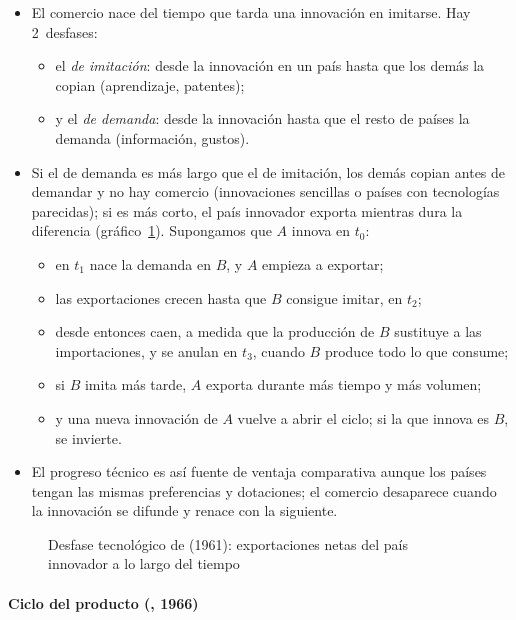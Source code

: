 \documentclass[11pt]{article}
\begin{document}
\begin{itemize}
\item El comercio nace del tiempo que tarda una innovación en imitarse\nocite{Posner1961International}. Hay 2~desfases:
  \begin{itemize}
  \item el \emph{de imitación}: desde la innovación en un país hasta que los demás la copian (aprendizaje, patentes);
  \item y el \emph{de demanda}: desde la innovación hasta que el resto de países la demanda (información, gustos).
  \end{itemize}
\item Si el de demanda es más largo que el de imitación, los demás copian antes de demandar y no hay comercio (innovaciones sencillas o países con tecnologías parecidas); si es más corto, el país innovador exporta mientras dura la diferencia (gráfico~\ref{fig:posner}). Supongamos que $A$ innova en $t_0$:
  \begin{itemize}
  \item en $t_1$ nace la demanda en $B$, y $A$ empieza a exportar;
  \item las exportaciones crecen hasta que $B$ consigue imitar, en $t_2$;
  \item desde entonces caen, a medida que la producción de $B$ sustituye a las importaciones, y se anulan en $t_3$, cuando $B$ produce todo lo que consume;
  \item si $B$ imita más tarde, $A$ exporta durante más tiempo y más volumen;
  \item y una nueva innovación de $A$ vuelve a abrir el ciclo; si la que innova es $B$, se invierte.
  \end{itemize}
\item El progreso técnico es así fuente de ventaja comparativa aunque los países tengan las mismas preferencias y dotaciones; el comercio desaparece cuando la innovación se difunde y renace con la siguiente.
\end{itemize}

\begin{figure}[H]
\centering
\caption{Desfase tecnológico de  (1961): exportaciones netas del país innovador a lo largo del tiempo}\label{fig:posner}
\end{figure}

\paragraph{Ciclo del producto (, 1966)}
\end{document}
